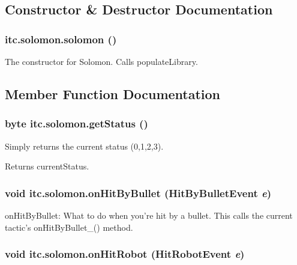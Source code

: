 \subsection{Constructor \& Destructor Documentation}
\hypertarget{classitc_1_1solomon_a774791cdf521fc7dc2118a761ccc0681}{
\subsubsection[{solomon}]{\setlength{\rightskip}{0pt plus 5cm}itc.solomon.solomon ()}}
\label{classitc_1_1solomon_a774791cdf521fc7dc2118a761ccc0681}
The constructor for Solomon. Calls populateLibrary. 

\subsection{Member Function Documentation}
\hypertarget{classitc_1_1solomon_a1192c7e80d463fb5e0c6e5fc7f8b8944}{
\subsubsection[{getStatus}]{\setlength{\rightskip}{0pt plus 5cm}byte itc.solomon.getStatus ()}}
\label{classitc_1_1solomon_a1192c7e80d463fb5e0c6e5fc7f8b8944}
Simply returns the current status (0,1,2,3). \begin{DoxyReturn}{Returns}
currentStatus. 
\end{DoxyReturn}
\hypertarget{classitc_1_1solomon_a61c2a71738163bea55b22c2ddd725117}{
\subsubsection[{onHitByBullet}]{\setlength{\rightskip}{0pt plus 5cm}void itc.solomon.onHitByBullet (HitByBulletEvent {\em e})}}
\label{classitc_1_1solomon_a61c2a71738163bea55b22c2ddd725117}
onHitByBullet: What to do when you're hit by a bullet. This calls the current tactic's onHitByBullet\_\-() method. \hypertarget{classitc_1_1solomon_a5e824f07f03d305450e42a4356a003a5}{
\subsubsection[{onHitRobot}]{\setlength{\rightskip}{0pt plus 5cm}void itc.solomon.onHitRobot (HitRobotEvent {\em e})}}
